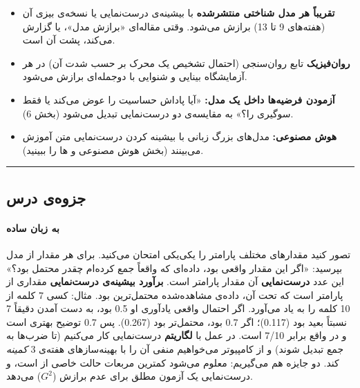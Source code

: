 \begin{itemize}
\tightlist
\item
  \textbf{تقریباً هر مدل شناختی منتشرشده} با بیشینه‌ی درست‌نمایی یا نسخه‌ی
  بیزی آن (هفته‌های 9 تا 13) برازش می‌شود. وقتی مقاله‌ای «برازش مدل»،
   یا  گزارش می‌کند،  پشت آن است.
\item
  \textbf{روان‌فیزیک } تابع روان‌سنجی (احتمال تشخیص
  یک محرک بر حسب شدت آن) در هر آزمایشگاه بینایی و شنوایی با 
  دوجمله‌ای برازش می‌شود.
\item
  \textbf{آزمودن فرضیه‌ها داخل یک مدل:} «آیا پاداش حساسیت را عوض می‌کند یا
  فقط سوگیری را؟» به مقایسه‌ی دو درست‌نمایی تبدیل می‌شود (بخش 6).
\item
  \textbf{هوش مصنوعی:} مدل‌های بزرگ زبانی با بیشینه کردن درست‌نمایی متن
  آموزش می‌بینند (بخش هوش مصنوعی و ها را ببینید).
\end{itemize}

\begin{center}\rule{0.5\linewidth}{0.5pt}\end{center}


\subsection{جزوه‌ی درس}

\paragraph{به زبان ساده}

تصور کنید مقدارهای مختلف پارامتر را یکی‌یکی امتحان می‌کنید. برای هر مقدار
از مدل بپرسید: «اگر این مقدار واقعی بود، داده‌ای که واقعاً جمع کرده‌ام چقدر
محتمل بود؟» این عدد \textbf{درست‌نمایی } آن مقدار
پارامتر است. \textbf{برآورد بیشینه‌ی درست‌نمایی } مقداری از
پارامتر است که تحت آن، داده‌ی مشاهده‌شده محتمل‌ترین بود. مثال: کسی 7 کلمه
از 10 کلمه را به یاد می‌آورد. اگر احتمال واقعی یادآوری او 0.5 بود، به دست
آمدن دقیقاً 7 نسبتاً بعید بود (0.117)؛ اگر 0.7 بود، محتمل‌تر بود (0.267).
پس 0.7 توضیح بهتری است و در واقع  برابر 7/10 است. در عمل با
\textbf{لگاریتم} درست‌نمایی کار می‌کنیم (تا ضرب‌ها به جمع تبدیل شوند) و از
کامپیوتر می‌خواهیم منفی آن  را با بهینه‌سازهای هفته‌ی 3
\emph{کمینه} کند. دو جایزه هم می‌گیریم: معلوم می‌شود کمترین مربعات حالت
خاصی از  است، و درست‌نمایی یک آزمون مطلق برای عدم برازش (\(G^2\))
می‌دهد.

